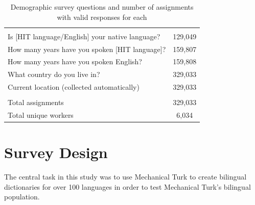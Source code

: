 \documentclass[11pt]{article}
\begin{document}
%

\begin{table}[h]
\centering
\begin{tabular}{lc}\hline\hline\\
Is [HIT language/English] your native language? &129,049\\
How many years have you spoken [HIT language]?&159,807\\
How many years have you spoken English?&159,808\\
What country do you live in?&329,033\\
Current location (collected automatically)& 329,033\\
\hline\\
Total assignments& 329,033\\
Total unique workers& 6,034\\
\hline\hline
\end{tabular}
\caption{Demographic survey questions and number of assignments with valid responses for each}
\label{survey-tab}
\end{table}


%
%
\section{Survey Design}
The central task in this study was to use Mechanical Turk to create bilingual dictionaries for over 100 languages in order to test Mechanical Turk's bilingual population. 
\end{document}
